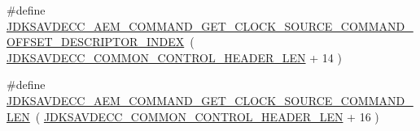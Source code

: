 \begin{DoxyCompactItemize}
\item 
\#define \hyperlink{group__command__get__clock__source_ga0664f372278c9fd31faf9e197dcd7403}{J\+D\+K\+S\+A\+V\+D\+E\+C\+C\+\_\+\+A\+E\+M\+\_\+\+C\+O\+M\+M\+A\+N\+D\+\_\+\+G\+E\+T\+\_\+\+C\+L\+O\+C\+K\+\_\+\+S\+O\+U\+R\+C\+E\+\_\+\+C\+O\+M\+M\+A\+N\+D\+\_\+\+O\+F\+F\+S\+E\+T\+\_\+\+D\+E\+S\+C\+R\+I\+P\+T\+O\+R\+\_\+\+I\+N\+D\+EX}~( \hyperlink{group__jdksavdecc__avtp__common__control__header_gaae84052886fb1bb42f3bc5f85b741dff}{J\+D\+K\+S\+A\+V\+D\+E\+C\+C\+\_\+\+C\+O\+M\+M\+O\+N\+\_\+\+C\+O\+N\+T\+R\+O\+L\+\_\+\+H\+E\+A\+D\+E\+R\+\_\+\+L\+EN} + 14 )
\item 
\#define \hyperlink{group__command__get__clock__source_ga5137c030b3a03f33046ec61353cc9b58}{J\+D\+K\+S\+A\+V\+D\+E\+C\+C\+\_\+\+A\+E\+M\+\_\+\+C\+O\+M\+M\+A\+N\+D\+\_\+\+G\+E\+T\+\_\+\+C\+L\+O\+C\+K\+\_\+\+S\+O\+U\+R\+C\+E\+\_\+\+C\+O\+M\+M\+A\+N\+D\+\_\+\+L\+EN}~( \hyperlink{group__jdksavdecc__avtp__common__control__header_gaae84052886fb1bb42f3bc5f85b741dff}{J\+D\+K\+S\+A\+V\+D\+E\+C\+C\+\_\+\+C\+O\+M\+M\+O\+N\+\_\+\+C\+O\+N\+T\+R\+O\+L\+\_\+\+H\+E\+A\+D\+E\+R\+\_\+\+L\+EN} + 16 )
\end{DoxyCompactItemize}
